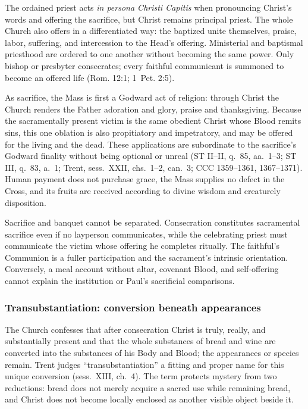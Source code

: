The ordained priest acts \emph{in persona Christi Capitis} when pronouncing Christ's words and offering the sacrifice, but Christ remains principal priest. The whole Church also offers in a differentiated way: the baptized unite themselves, praise, labor, suffering, and intercession to the Head's offering. Ministerial and baptismal priesthood are ordered to one another without becoming the same power. Only bishop or presbyter consecrates; every faithful communicant is summoned to become an offered life (Rom. 12:1; 1~Pet. 2:5).

As sacrifice, the Mass is first a Godward act of religion: through Christ the Church renders the Father adoration and glory, praise and thanksgiving. Because the sacramentally present victim is the same obedient Christ whose Blood remits sins, this one oblation is also propitiatory and impetratory, and may be offered for the living and the dead. These applications are subordinate to the sacrifice's Godward finality without being optional or unreal (ST II--II, q.~85, aa.~1--3; ST III, q.~83, a.~1; Trent, sess.~XXII, chs.~1--2, can.~3; CCC 1359--1361, 1367--1371). Human payment does not purchase grace, the Mass supplies no defect in the Cross, and its fruits are received according to divine wisdom and creaturely disposition.

Sacrifice and banquet cannot be separated. Consecration constitutes sacramental sacrifice even if no layperson communicates, while the celebrating priest must communicate the victim whose offering he completes ritually. The faithful's Communion is a fuller participation and the sacrament's intrinsic orientation. Conversely, a meal account without altar, covenant Blood, and self-offering cannot explain the institution or Paul's sacrificial comparisons.

\subsubsection{Transubstantiation: conversion beneath appearances}

The Church confesses that after consecration Christ is truly, really, and substantially present and that the whole substances of bread and wine are converted into the substances of his Body and Blood; the appearances or species remain. Trent judges ``transubstantiation'' a fitting and proper name for this unique conversion (sess.~XIII, ch.~4). The term protects mystery from two reductions: bread does not merely acquire a sacred use while remaining bread, and Christ does not become locally enclosed as another visible object beside it.

